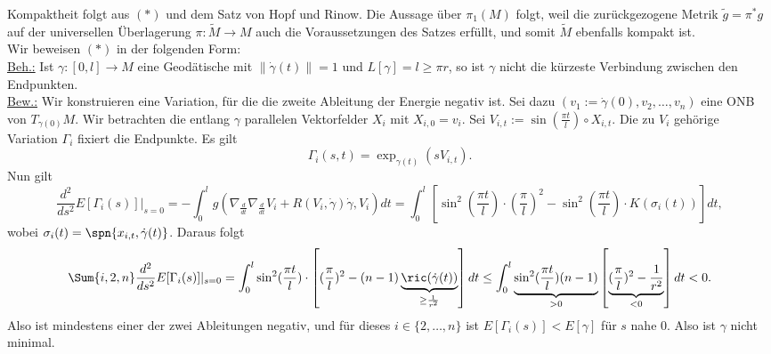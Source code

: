 \begin{beweis}
Kompaktheit folgt aus $(\ast)$ und dem Satz von Hopf und Rinow. Die Aussage über $\pi_1(M)$ folgt, weil die zurückgezogene Metrik $\tilde{g} = \pi^\ast g$ auf der universellen Überlagerung $\pi: \tilde{M} \to M$ auch die Voraussetzungen des Satzes erfüllt, und somit $\tilde{M}$ ebenfalls kompakt ist.\\
Wir beweisen $(\ast)$ in der folgenden Form:\\
\underline{Beh.:} \quad Ist $\gamma:[0,l] \to M$ eine Geodätische mit $\|\dot{\gamma}(t)\| = 1$ und $L[\gamma]=l \geq \pi r$, so ist $\gamma$ nicht die kürzeste Verbindung zwischen den Endpunkten.\\
\underline{Bew.:} \quad Wir konstruieren eine Variation, für die die zweite Ableitung der Energie negativ ist. Sei dazu $(v_1:= \dot{\gamma}(0), v_2, \dots, v_n)$ eine ONB von $T_{\gamma(0)}M$. Wir betrachten die entlang $\gamma$ parallelen Vektorfelder $X_i$ mit $X_{i,0}=v_i$. Sei $V_{i,t} := \sin(\frac{\pi t}{l}) \circ X_{i,t}$. Die zu $V_i$ gehörige Variation $\Gamma_i$ fixiert die Endpunkte. Es gilt
\begin{equation}
\Gamma_i (s,t) = \exp_{\gamma(t)}(sV_{i,t}).
\end{equation}
Nun gilt
\begin{equation}
\frac{d^2}{ds^2} E[\Gamma_i (s)]|_{s=0} = - \int_0^l g(\nabla_\frac{d}{dt} \nabla_\frac{d}{dt} V_i + R(V_i, \dot{\gamma})\dot{\gamma}, V_i) dt = \int_0^l \left[\sin^2(\frac{\pi t}{l})\cdot(\frac{\pi}{l})^2 - \sin^2(\frac{\pi t}{l}) \cdot K(\sigma_i(t))\right] dt,
\end{equation}
wobei $\sigma_i(t) =\spn \{ x_{i,t}, \dot{\gamma}(t) \}$. Daraus folgt
\begin{equation}
\Sum{i,2,n} \frac{d^2}{ds^2} E[\Gamma_i(s)]|_{s=0} = \int_0^l \sin^2(\frac{\pi t}{l}) \cdot \left[ (\frac{\pi}{l})^2 - (n-1) \underbrace{\ric(\dot{\gamma} (t))}_{\geq \frac{1}{r^2}} \right] dt \leq  \int_0^l \underbrace{\sin^2(\frac{\pi t}{l})(n-1)}_{> 0} \left[ \underbrace{(\frac{\pi}{l})^2 - \frac{1}{r^2}}_{< 0} \right] dt < 0 .
\end{equation}
Also ist mindestens einer der zwei Ableitungen negativ, und für dieses $i \in \{ 2, \dots, n\}$ ist $E[\Gamma_i(s)] < E[\gamma]$ für $s$ nahe $0$. Also ist $\gamma$ nicht minimal.
\end{beweis}

